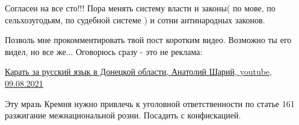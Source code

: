 \begin{itemize}
Согласен на все сто!!!
Пора менять систему власти и законы( по мове, по сельхозугодьям, по судебной системе ) и сотни антинародных законов.

 
Позволь мне прокомментировать твой пост коротким видео. Возможно ты его видел,
но все же... Оговорюсь сразу - это не реклама:

\href{https://www.youtube.com/watch?v=BaCTYBBN5Q8}{%
Карать за русский язык в Донецкой области, %
Анатолий Шарий, youtube, 09.08.2021%
}

 
Эту мразь Кремня нужно привлечь к уголовной ответственности по статье 161
разжигание межнациональной розни. Посадить с конфискацией.

\end{itemize}

